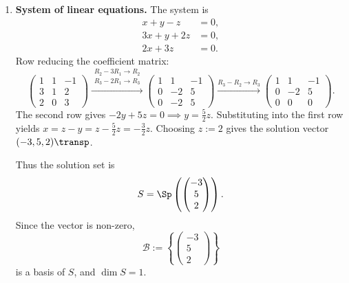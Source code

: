 \begin{exercisesolution*}
\label{sol:bases_dimensions_various_spaces}
\begin{enumerate}[label=\textbf{(\alph*)}]
    \item \textbf{System of linear equations.} The system is
    \[
        \begin{aligned}
            x + y - z &= 0, \\
            3x + y + 2z &= 0, \\
            2x + 3z &= 0.
        \end{aligned}
    \]
    Row reducing the coefficient matrix:
    \[
        \begin{pmatrix}
            1 & 1 & -1 \\
            3 & 1 & 2 \\
            2 & 0 & 3
        \end{pmatrix}
        \xrightarrow{\substack{R_2 - 3R_1 \to R_2 \\ R_3 - 2R_1 \to R_3}}
        \begin{pmatrix}
            1 & 1 & -1 \\
            0 & -2 & 5 \\
            0 & -2 & 5
        \end{pmatrix}
        \xrightarrow{R_3 - R_2 \to R_3}
        \begin{pmatrix}
            1 & 1 & -1 \\
            0 & -2 & 5 \\
            0 & 0 & 0
        \end{pmatrix}.
    \]
    The second row gives $-2y + 5z = 0 \implies y = \frac{5}{2}z$. Substituting into the first row yields $x = z - y = z - \frac{5}{2}z = -\frac{3}{2}z$. Choosing $z := 2$ gives the solution vector $(-3, 5, 2)\transp$.
    
    Thus the solution set is
    \[
    S = \Sp\left( \begin{pmatrix} -3 \\ 5 \\ 2 \end{pmatrix} \right).
    \]
    Since the vector is non-zero,
    \[
    \mathcal{B} := \left\{ \begin{pmatrix} -3 \\ 5 \\ 2 \end{pmatrix} \right\}
    \]
    is a basis of $S$, and $\dim S = 1$.


\end{enumerate}
\end{exercisesolution*}
